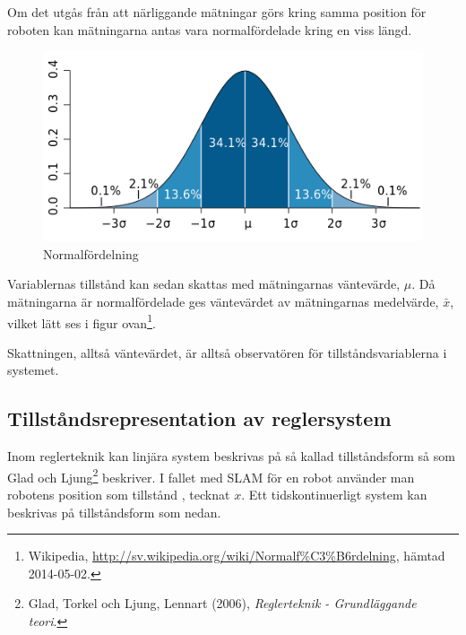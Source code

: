 \documentclass[a4paper,12pt,fleqn]{article}
\begin{document}
Om det utgås från att närliggande mätningar görs kring samma position för roboten kan mätningarna antas vara normalfördelade kring en viss längd. 

\begin{figure}[htp] %
  \begin{center}
  \includegraphics[keepaspectratio=true,scale=0.5]{normalfordelning.png}  %
  \end{center}
  \caption{Normalfördelning} %
  \label{fig:fire} %
\end{figure}

Variablernas tillstånd kan sedan skattas med mätningarnas väntevärde, $\mu$. Då mätningarna är normalfördelade ges väntevärdet av mätningarnas medelvärde, $\bar{x}$, vilket lätt ses i figur ovan\footnote{Wikipedia, \url{http://sv.wikipedia.org/wiki/Normalf\%C3\%B6rdelning}, hämtad 2014-05-02.}. 

Skattningen, alltså väntevärdet, är alltså observatören för tillståndsvariablerna i systemet. 

\newpage

\subsection{Tillståndsrepresentation av reglersystem}

Inom reglerteknik kan linjära system beskrivas på så kallad tillståndsform så som Glad och Ljung\footnote{Glad, Torkel och Ljung, Lennart (2006), \textit{Reglerteknik - Grundläggande teori}.} beskriver. I fallet med SLAM för en robot använder man robotens position som tillstånd , tecknat $x$. Ett tidskontinuerligt system kan beskrivas på tillståndsform som nedan.
\end{document}
